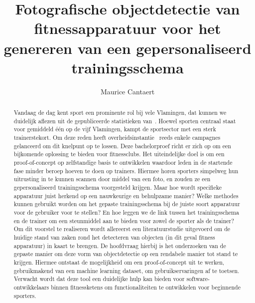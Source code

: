 \documentclass{hogent-article}
\title{Fotografische objectdetectie van fitnessapparatuur voor het genereren van een gepersonaliseerd trainingsschema}
\author{Maurice Cantaert}
\begin{document}
    \begin{abstract}
        Vandaag de dag kent sport een prominente rol bij vele Vlamingen, dat kunnen we duidelijk aflezen uit de gepubliceerde statistieken van~\textcite{StatistiekVlaanderen2023}.
        Hoewel sporten centraal staat voor gemiddeld \'e\'en op de vijf Vlamingen, kampt de sportsector met een sterk trainerstekort.
        Om deze reden heeft overheidsinstantie~\textcite{SportVlaanderen2023} reeds enkele campagnes gelanceerd om dit knelpunt op te lossen.
        Deze bachelorproef richt er zich op om een bijkomende oplossing te bieden voor fitnessclubs.
        Het uiteindelijke doel is om een proof-of-concept op zelfstandige basis te ontwikkelen waardoor leden in de startende fase minder beroep hoeven te doen op trainers.
        Hiermee horen sporters simpelweg hun uitrusting in te kunnen scannen door middel van een foto, en zouden ze een gepersonaliseerd trainingsschema voorgesteld krijgen.
        Maar hoe wordt specifieke apparatuur juist herkend op een nauwkeurige en behulpzame manier?
        Welke methodes kunnen gebruikt worden om het gepaste trainingsschema bij de juiste soort apparatuur voor de gebruiker voor te stellen?
        En hoe leggen we de link tussen het trainingsschema en de trainer om een steunmiddel aan te bieden voor zowel de sporter als de trainer?
        Om dit voorstel te realiseren wordt allereerst een literatuurstudie uitgevoerd om de huidige stand van zaken rond het detecteren van objecten (in dit geval fitness apparatuur) in kaart te brengen.
        De hoofdvraag hierbij is het onderzoeken van de gepaste manier om deze vorm van objectdetectie op een rendabele manier tot stand te krijgen.
        Hiermee ontstaat de mogelijkheid om een proof-of-concept uit te werken, gebruikmakend van een machine learning dataset, om gebruikservaringen af te toetsen.
        Verwacht wordt dat deze tool een duidelijke hulp kan bieden voor software-ontwikkelaars binnen fitnessketens om functionaliteiten te ontwikkelen voor beginnende sporters.
    \end{abstract}

    \tableofcontents

    

    \printbibliography[heading=bibintoc]
\end{document}
